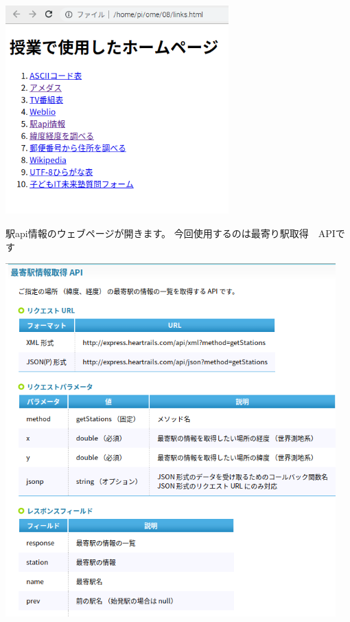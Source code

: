 \documentclass[a4paper,12pt,dvipdfmx]{jarticle}
\begin{document}
\begin{center}
\includegraphics[width=8.59cm,height=8.029cm]{textbook-img017.png}

\end{center}


\bigskip


\bigskip

駅api情報のウェブページが開きます。
今回使用するのは最寄り駅取得　APIです



\begin{center}
\includegraphics[width=12.719cm,height=13.6cm]{textbook-img049.png}

\end{center}
\end{document}
